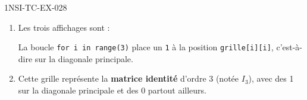 \begin{corrige}{1NSI-TC-EX-028}
\begin{enumerate}
  \item Les trois affichages sont :
\begin{console}
[1, 0, 0]
[0, 1, 0]
[0, 0, 1]
\end{console}
  La boucle \lstinline{for i in range(3)} place un \lstinline{1} à la position \lstinline{grille[i][i]}, c'est-à-dire sur la diagonale principale.

  \item Cette grille représente la \textbf{matrice identité} d'ordre 3 (notée $I_3$), avec des 1 sur la diagonale principale et des 0 partout ailleurs.
\end{enumerate}
\end{corrige}
